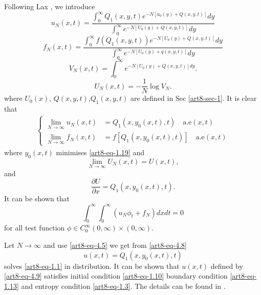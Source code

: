 Following Lax \cite{art8-key9}, we introduce
\begin{equation}\label{art8-eq-4.1}
u_{N}(x, t) = \dfrac{\int_{0}^{\infty}Q_{1}(x,y,t)e^{-N[u_{0}(y)+Q(x,y,t)]}dy}{\int_{0}^{\infty}e^{-N[U_{0}(y)+Q(x,y,t)]}dy}
\end{equation}
\begin{equation}\label{art8-eq-4.2}
f_{N}(x,t) =  \dfrac{\int_{0}^{\infty} f(Q_{1}(x,y,t))e^{-N[U_{0}(y)+Q(x,y,t)]}dy} {\int_{0}^{\infty} e^{-N[U_{0}(y) +q(x,y,t)]}dy}
\end{equation}
\begin{equation}\label{art8-eq-4.3}
V_{N}(x,t) = \int_{0}^{\infty}e^{-N[U_{0}(y) + Q(x,y,t)]dy}.
\end{equation}
\begin{equation}\label{art8-eq-4.4}
U_{N}(x,t) = -\dfrac{1}{N}\log V_{N}.
\end{equation}
where $U_{0}(x)$, $Q(x,y,t)$,$Q_{1}(x,y,t)$ are defined in Sec \ref{art8-sec-1}. It is clear that
\begin{align}\label{art8-eq-4.5}
\begin{cases}
\lim_{N\rightarrow \infty}u_{N}(x,t)&= Q_{1}(x,y_{0}(x,t),t) \quad \text{a.e} (x,t)\\
\lim_{N\rightarrow \infty}f_{N}(x,t)&= f[Q_{1}(x,y_{0}(x,t),t)]\quad \text{a.e} (x,t)
\end{cases}
\end{align}
where $y_{0}(x,t)$ minimises \eqref{art8-eq-1.19} and
\begin{equation}\label{art8-eq-4.6}
\lim\limits_{N \rightarrow \infty}U_{N}(x,t)=U(x,t),
\end{equation}
and
\begin{equation}\label{art8-eq-4.7}
\dfrac{\partial U}{\partial x} = Q_{1}(x, y_{0}(x,t),t).
\end{equation}
It can be shown that
\begin{equation}\label{art8-eq-4.8}
\int_{0}^{\infty} \int_{0}^{\infty} (u_{N}\phi_{t} + f_{N})dx dt =0
\end{equation}
for all test function $\phi \in C_{0}^{\infty}(0,\infty) \times (0, \infty)$.

Let $N\rightarrow \infty$ and use \eqref{art8-eq-4.5} we get from \eqref{art8-eq-4.8}
\begin{equation}\label{art8-eq-4.9}
u(x,t) =Q_{1}(x, y_{0}(x,t),t)
\end{equation}
solves \eqref{art8-eq-1.1} in distribution. It can be shown that $u(x,t)$ defined by \eqref{art8-eq-4.9} satisfies initial condition \eqref{art8-eq-1.10} boundary condition \eqref{art8-eq-1.13} and entropy condition \eqref{art8-eq-1.3}. The details can be found in \cite{art8-key5}.

